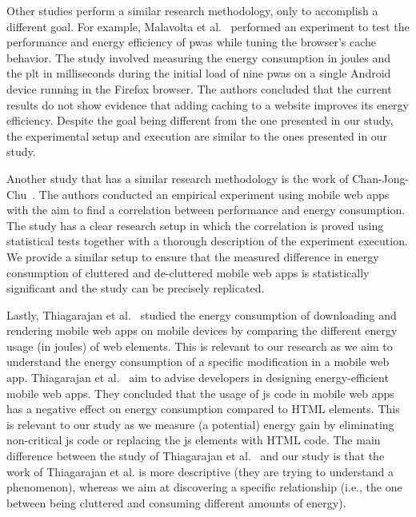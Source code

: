 Other studies perform a similar research methodology, only to accomplish a different goal. For example, Malavolta et al.~\cite{Evaluating_Caching} performed an experiment to test the performance and energy efficiency of \acrfull{pwas} while tuning the browser's cache behavior. The study involved measuring the energy consumption in joules and the \acrshort{plt} in milliseconds during the initial load of nine \acrshort{pwas} on a single Android device running in the Firefox browser. The authors concluded that the current results do not show evidence that adding caching to a website improves its energy efficiency. Despite the goal being different from the one presented in our study, the experimental setup and execution are similar to the ones presented in our study.

Another study that has a similar research methodology is the work of Chan-Jong-Chu~\cite{chan2020investigating}. The authors conducted an empirical experiment using mobile web apps with the aim to find a correlation between performance and energy consumption. The study has a clear research setup in which the correlation is proved using statistical tests together with a thorough description of the experiment execution. We provide a similar setup to ensure that the measured difference in energy consumption of cluttered and de-cluttered mobile web apps is statistically significant and the study can be precisely replicated.

Lastly, Thiagarajan et al.~\cite{thiagarajan2012battery} studied the energy consumption of downloading and rendering mobile web apps on mobile devices by comparing the different energy usage (in joules) of web elements. This is relevant to our research as we aim to understand the energy consumption of a specific modification in a mobile web app. Thiagarajan et al.~\cite{thiagarajan2012battery} aim to advise developers in designing energy-efficient mobile web apps. They concluded that the usage of \acrshort{js} code in mobile web apps has a negative effect on energy consumption compared to HTML elements. This is relevant to our study as we measure (a potential) energy gain by eliminating non-critical \acrshort{js} code or replacing the \acrshort{js} elements with HTML code. The main difference between the study of Thiagarajan et al.~\cite{thiagarajan2012battery} and our study is that the work of Thiagarajan et al. is more descriptive (they are trying to understand a phenomenon), whereas we aim at discovering a specific relationship (i.e., the one between being cluttered and consuming different amounts of energy).

